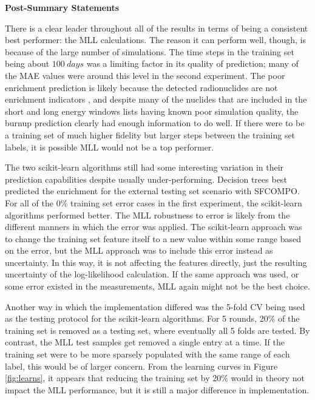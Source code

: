\noindent \textbf{Post-Summary Statements}

There is a clear leader throughout all of the results in terms of being a
consistent best performer: the \gls{MLL} calculations. The reason it can
perform well, though, is because of the large number of simulations.  The time
steps in the training set being about $100\:days$ was a limiting factor in its
quality of prediction; many of the \gls{MAE} values were around this level in
the second experiment. The poor enrichment prediction is likely because the
detected radionuclides are not enrichment indicators , and despite
many of the nuclides that are included in the short and long energy windows
lists having known poor simulation quality, the burnup prediction clearly had
enough information to do well.  If there were to be a training set of much
higher fidelity but larger steps between the training set labels, it is
possible \gls{MLL} would not be a top performer. 

The two scikit-learn algorithms still had some interesting variation in their
prediction capabilities despite usually under-performing. Decision trees best
predicted the enrichment for the external testing set scenario with
\gls{SFCOMPO}. For all of the 0\% training set error cases in the first
experiment, the scikit-learn algorithms performed better.  The \gls{MLL}
robustness to error is likely from the different manners in which the error was
applied.  The scikit-learn approach was to change the training set feature
itself to a new value within some range based on the error, but the \gls{MLL}
approach was to include this error instead as uncertainty. In this way, it is
not affecting the features directly, just the resulting uncertainty of the
log-likelihood calculation. If the same approach was used, or some error
existed in the measurements, \gls{MLL} again might not be the best choice. 

Another way in which the implementation differed was the 5-fold \gls{CV} being
used as the testing protocol for the scikit-learn algorithms. For 5 rounds,
20\% of the training set is removed as a testing set, where eventually all 5
folds are tested.  By contrast, the \gls{MLL} test samples get removed a single
entry at a time.  If the training set were to be more sparsely populated with
the same range of each label, this would be of larger concern.  From the
learning curves in Figure \ref{fig:learns}, it appears that reducing the
training set by 20\% would in theory not impact the \gls{MLL} performance, but
it is still a major difference in implementation. 

